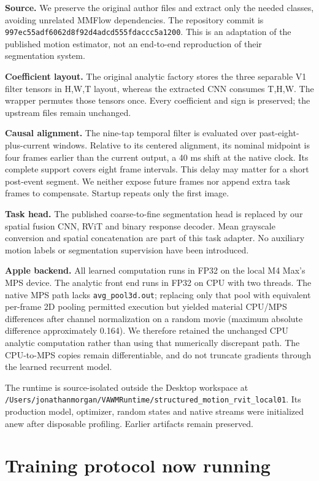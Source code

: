 \documentclass[11pt]{article}
\newcommand{\code}[1]{\nolinkurl{#1}}
\begin{document}
\textbf{Source.} We preserve the original author files and extract only the needed classes, avoiding unrelated MMFlow dependencies. The repository commit is \code{997ec55adf6062d8f92d4adcd555fdaccc5a1200}. This is an adaptation of the published motion estimator, not an end-to-end reproduction of their segmentation system.

\textbf{Coefficient layout.} The original analytic factory stores the three separable V1 filter tensors in H,W,T layout, whereas the extracted CNN consumes T,H,W. The wrapper permutes those tensors once. Every coefficient and sign is preserved; the upstream files remain unchanged.

\textbf{Causal alignment.} The nine-tap temporal filter is evaluated over past-eight-plus-current windows. Relative to its centered alignment, its nominal midpoint is four frames earlier than the current output, a 40 ms shift at the native clock. Its complete support covers eight frame intervals. This delay may matter for a short post-event segment. We neither expose future frames nor append extra task frames to compensate. Startup repeats only the first image.

\textbf{Task head.} The published coarse-to-fine segmentation head is replaced by our spatial fusion CNN, RViT and binary response decoder. Mean grayscale conversion and spatial concatenation are part of this task adapter. No auxiliary motion labels or segmentation supervision have been introduced.

\textbf{Apple backend.} All learned computation runs in FP32 on the local M4 Max's MPS device. The analytic front end runs in FP32 on CPU with two threads. The native MPS path lacks \code{avg_pool3d.out}; replacing only that pool with equivalent per-frame 2D pooling permitted execution but yielded material CPU/MPS differences after channel normalization on a random movie (maximum absolute difference approximately 0.164). We therefore retained the unchanged CPU analytic computation rather than using that numerically discrepant path. The CPU-to-MPS copies remain differentiable, and do not truncate gradients through the learned recurrent model.

The runtime is source-isolated outside the Desktop workspace at \code{/Users/jonathanmorgan/VAWMRuntime/structured_motion_rvit_local01}. Its production model, optimizer, random states and native streams were initialized anew after disposable profiling. Earlier artifacts remain preserved.

\section{Training protocol now running}
\end{document}
